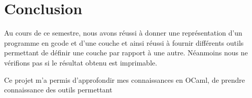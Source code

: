 \documentclass[11pt, titlepage]{article}
\begin{document}
\section{Conclusion}
Au cours de ce semestre, nous avons réussi à donner une représentation d'un programme en gcode et d'une couche et ainsi réussi à fournir différents outils permettant de définir une couche par rapport à une autre. Néanmoins nous ne vérifions pas si le résultat obtenu est imprimable.

Ce projet m'a permis d'approfondir mes connaissances en OCaml, de prendre connaissance des outils permettant 
\end{document}
